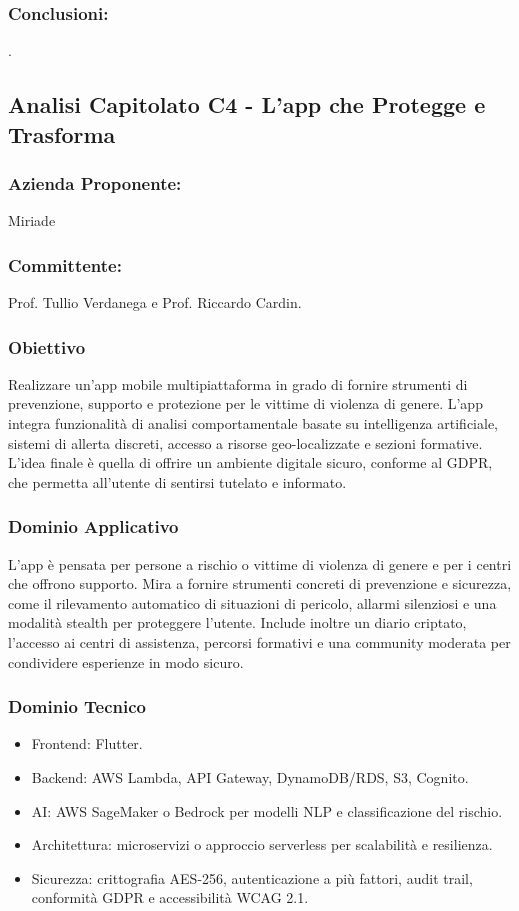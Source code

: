 \documentclass[a4paper,12pt]{article}
\begin{document}
\subsubsection*{Conclusioni:}
. 



\subsection{Analisi Capitolato C4 - L’app che Protegge e Trasforma}
\subsubsection*{Azienda Proponente:} Miriade
\subsubsection*{Committente:} Prof. Tullio Verdanega e Prof. Riccardo Cardin.
\subsubsection*{Obiettivo}
Realizzare un’app mobile multipiattaforma in grado di fornire strumenti di prevenzione, supporto e protezione per le vittime di violenza di genere.  
L’app integra funzionalità di analisi comportamentale basate su intelligenza artificiale, sistemi di allerta discreti, accesso a risorse geo-localizzate e sezioni formative.  
L’idea finale è quella di offrire un ambiente digitale sicuro, conforme al GDPR, che permetta all’utente di sentirsi tutelato e informato.

\subsubsection*{Dominio Applicativo}
L’app è pensata per persone a rischio o vittime di violenza di genere e per i centri che offrono supporto.  
Mira a fornire strumenti concreti di prevenzione e sicurezza, come il rilevamento automatico di situazioni di pericolo, allarmi silenziosi e una modalità stealth per proteggere l’utente.  
Include inoltre un diario criptato, l’accesso ai centri di assistenza, percorsi formativi e una community moderata per condividere esperienze in modo sicuro.


\subsubsection*{Dominio Tecnico}
\begin{itemize}[leftmargin=*]
    \item Frontend: Flutter.
    \item Backend: AWS Lambda, API Gateway, DynamoDB/RDS, S3, Cognito.
    \item AI: AWS SageMaker o Bedrock per modelli NLP e classificazione del rischio.
    \item Architettura: microservizi o approccio serverless per scalabilità e resilienza.
    \item Sicurezza: crittografia AES-256, autenticazione a più fattori, audit trail, conformità GDPR e accessibilità WCAG 2.1.
\end{itemize}
\end{document}
